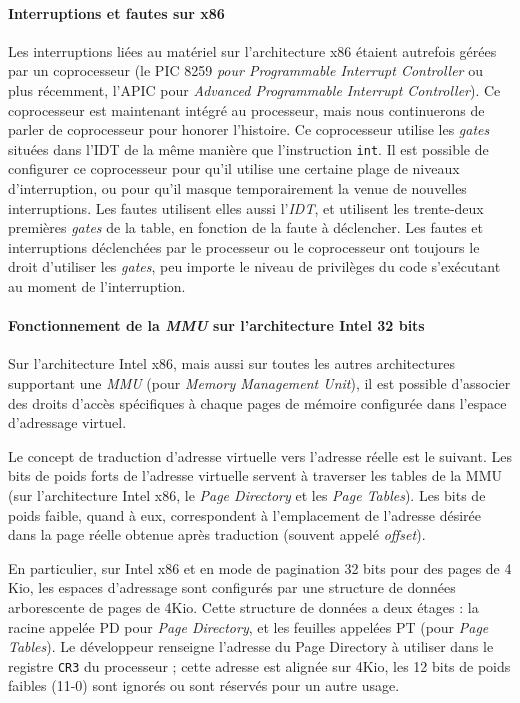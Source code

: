 \paragraph{Interruptions et fautes sur x86}

Les interruptions liées au matériel sur l'architecture x86 étaient autrefois gérées par un coprocesseur (le PIC 8259 \emph{pour Programmable Interrupt Controller} ou plus récemment, l'APIC pour \emph{Advanced Programmable Interrupt Controller}). Ce coprocesseur est maintenant intégré au processeur, mais nous continuerons de parler de coprocesseur pour honorer l'histoire. Ce coprocesseur utilise les \emph{gates} situées dans l'IDT de la même manière que l'instruction \texttt{int}. Il est possible de configurer ce coprocesseur
pour qu'il utilise une certaine plage de niveaux d'interruption, ou pour qu'il masque temporairement la venue de nouvelles interruptions. Les fautes utilisent elles aussi l'\emph{IDT}, et utilisent les trente-deux premières \emph{gates} de la table, en fonction de la faute à déclencher. Les fautes et interruptions déclenchées par le processeur ou le coprocesseur ont toujours le droit d'utiliser les \emph{gates}, peu importe le niveau de privilèges du code s'exécutant au moment de l'interruption.

\paragraph{Fonctionnement de la \emph{MMU} sur l'architecture Intel 32 bits}
\label{sec:intel_mmu}
Sur l'architecture Intel x86, mais aussi sur toutes les autres architectures supportant une \emph{MMU} (pour \emph{Memory Management Unit}), il est possible d'associer des droits d'accès spécifiques à chaque pages de mémoire configurée dans l'espace d'adressage virtuel.

Le concept de traduction d'adresse virtuelle vers l'adresse réelle est le suivant. Les bits de poids forts de l'adresse virtuelle servent à traverser les tables de la MMU (sur l'architecture Intel x86, le \emph{Page Directory} et les \emph{Page Tables}). Les bits de poids faible, quand à eux, correspondent à l'emplacement de l'adresse désirée dans la page réelle obtenue après traduction (souvent appelé \emph{offset}).

En particulier, sur Intel x86 et en mode de pagination 32 bits pour des pages de 4 Kio, les espaces d'adressage sont configurés par une structure de données arborescente de pages de 4Kio. Cette structure de données a deux étages : la racine appelée PD pour \emph{Page Directory}, et les feuilles appelées PT (pour \emph{Page Tables}). Le développeur renseigne l'adresse du Page Directory à utiliser dans le registre \texttt{CR3} du processeur ; cette adresse est alignée sur 4Kio, les 12 bits de poids faibles (11-0) sont ignorés ou sont réservés pour un autre usage.

